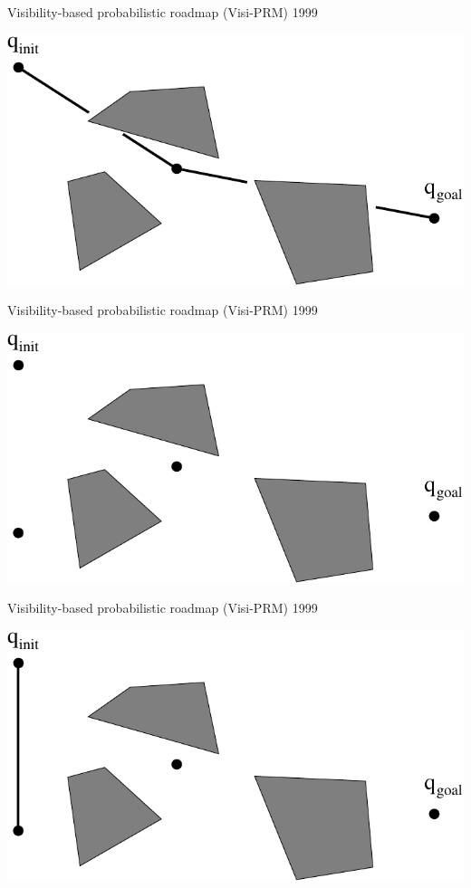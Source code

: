 \begin{frame} {Visibility-based probabilistic roadmap (Visi-PRM) 1999}
\centerline {
  \includegraphics[width=.8\linewidth]{figures/VPRM3.pdf}
}
\end{frame}

\begin{frame} {Visibility-based probabilistic roadmap (Visi-PRM) 1999}
\centerline {
  \includegraphics[width=.8\linewidth]{figures/VPRM4.pdf}
}
\end{frame}

\begin{frame} {Visibility-based probabilistic roadmap (Visi-PRM) 1999}
\centerline {
  \includegraphics[width=.8\linewidth]{figures/VPRM5.pdf}
}
\end{frame}


